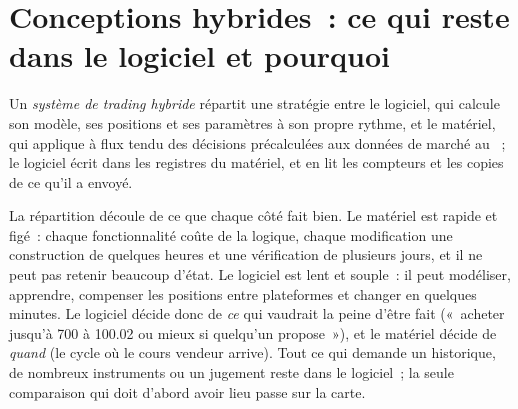\section{Conceptions hybrides~: ce qui reste dans le logiciel et pourquoi}

\begin{definition}\label{def:nw:programmable-hardware-ii-trading-designs:hybrid}
Un \emph{système de trading hybride} répartit une stratégie entre le logiciel, qui calcule son modèle, ses positions
et ses paramètres à son propre rythme, et le matériel, qui applique à flux tendu des décisions précalculées aux données de marché au ~; le logiciel écrit dans les
registres du matériel, et en lit les compteurs et les copies de ce qu'il a envoyé.
\end{definition}

La répartition découle de ce que chaque côté fait bien. Le matériel est rapide et figé~: chaque fonctionnalité coûte de la logique, chaque modification une construction de
quelques heures et une vérification de plusieurs jours, et il ne peut pas retenir beaucoup d'état. Le logiciel est lent et souple~: il peut modéliser, apprendre, compenser les positions
entre plateformes et changer en quelques minutes. Le logiciel décide donc de \emph{ce} qui vaudrait la peine d'être fait («~acheter jusqu'à 700 à 100.02 ou mieux si
quelqu'un propose~»), et le matériel décide de \emph{quand} (le cycle où le cours vendeur arrive). Tout ce qui demande un historique, de nombreux instruments ou
un jugement reste dans le logiciel~; la seule comparaison qui doit d'abord avoir lieu passe sur la carte.


